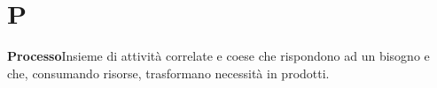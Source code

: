 \newpage
\section{P}\label{l:P}
\textbf{Processo}\newline Insieme di attività correlate e coese che rispondono ad un bisogno e che, consumando risorse, trasformano necessità in prodotti.